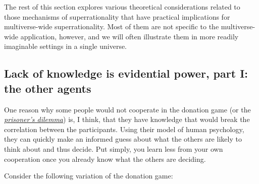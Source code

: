 The rest of this section explores various theoretical considerations
related to those mechanisms of superrationality that have practical
implications for multiverse-wide superrationality. Most of them are not
specific to the multiverse-wide application, however, and we will often
illustrate them in more readily imaginable settings in a single
universe.

\hypertarget{lack-of-knowledge-is-evidential-power-part-i-the-other-agents}{\subsection{Lack
of knowledge is evidential power, part I: the other
agents}\label{lack-of-knowledge-is-evidential-power-part-i-the-other-agents}}

One reason why some people would not cooperate in the donation game (or
the
\href{https://en.wikipedia.org/wiki/Prisoner\%27s_dilemma}{\emph{prisoner's
dilemma}}) is, I think, that they have knowledge that would break the
correlation between the participants. Using their model of human
psychology, they can quickly make an informed guess about what the
others are likely to think about and thus decide. Put simply, you learn
less from your own cooperation once you already know what the others are
deciding.

Consider the following variation of the donation game:

